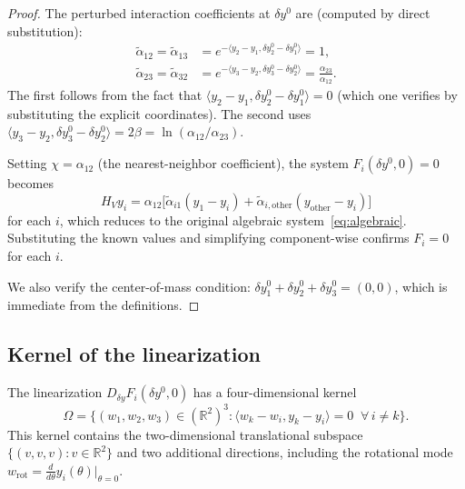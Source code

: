 \documentclass[11pt]{article}
\theoremstyle{plain}%
\theoremstyle{definition}%
\theoremstyle{definition}%
\theoremstyle{remark}%
\numberwithin{equation}{section}
\newcommand{\R}{\mathbb{R}}
\newcommand{\HV}{H_V}
\newcommand{\ip}[2]{\langle #1, #2 \rangle}
\begin{document}
\begin{proof}
The perturbed interaction coefficients at $\delta y^0$ are (computed by direct substitution):
\begin{align*}
\tilde{\alpha}_{12} = \tilde{\alpha}_{13} &= e^{-\ip{y_2-y_1}{\delta y_2^0-\delta y_1^0}} = 1, \\
\tilde{\alpha}_{23} = \tilde{\alpha}_{32} &= e^{-\ip{y_3-y_2}{\delta y_3^0-\delta y_2^0}} = \frac{\alpha_{23}}{\alpha_{12}}.
\end{align*}
The first follows from the fact that $\ip{y_2-y_1}{\delta y_2^0-\delta y_1^0}=0$ (which one verifies by substituting the explicit coordinates). The second uses $\ip{y_3-y_2}{\delta y_3^0-\delta y_2^0}=2\beta=\ln(\alpha_{12}/\alpha_{23})$.

Setting $\chi=\alpha_{12}$ (the nearest-neighbor coefficient), the system $F_i(\delta y^0,0)=0$ becomes
\[
\HV y_i = \alpha_{12}\bigl[\tilde{\alpha}_{i1}(y_1-y_i) + \tilde{\alpha}_{i,\text{other}}(y_{\text{other}}-y_i)\bigr]
\]
for each $i$, which reduces to the original algebraic system~\eqref{eq:algebraic}. Substituting the known values and simplifying component-wise confirms $F_i=0$ for each $i$.

We also verify the center-of-mass condition: $\delta y_1^0+\delta y_2^0+\delta y_3^0 = (0,0)$, which is immediate from the definitions.
\end{proof}


\subsection{Kernel of the linearization}\label{subsec:kernel}

\begin{prop}\label{prop:kernel}
The linearization $D_{\delta y}F_i(\delta y^0,0)$ has a four-dimensional kernel
\[
\Omega = \{(w_1,w_2,w_3)\in(\R^2)^3 : \ip{w_k-w_i}{y_k-y_i}=0\;\;\forall\, i\neq k\}.
\]
This kernel contains the two-dimensional translational subspace $\{(v,v,v):v\in\R^2\}$ and two additional directions, including the rotational mode $w_{\mathrm{rot}}=\frac{d}{d\theta}y_i(\theta)\big|_{\theta=0}$.
\end{prop}
\end{document}
